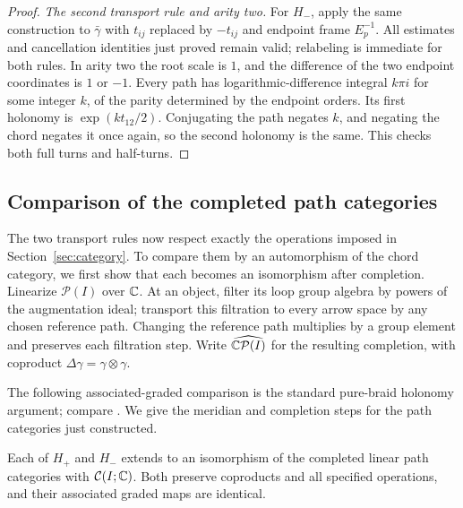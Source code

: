 \begin{proof}
\emph{The second transport rule and arity two.}
For $H_-$, apply the same construction to $\bar\gamma$ with
$t_{ij}$ replaced by $-t_{ij}$ and endpoint frame $E_p^{-1}$.
All estimates and cancellation identities just proved remain valid;
relabeling is immediate for both rules.  In arity two the root scale
is $1$, and the difference of the two endpoint coordinates is $1$ or
$-1$.  Every path has logarithmic-difference integral $k\pi i$ for
some integer $k$, of the parity determined by the endpoint orders.
Its first holonomy is $\exp(kt_{12}/2)$.  Conjugating the path negates
$k$, and negating the chord negates it once again, so the second
holonomy is the same.  This checks both full turns and half-turns.
\end{proof}

\subsection{Comparison of the completed path categories}
The two transport rules now respect exactly the operations imposed in
Section~\ref{sec:category}.  To compare them by an automorphism of the
chord category, we first show that each becomes an isomorphism after
completion.
Linearize $\mathcal P(I)$ over $\mathbb C$.
At an object, filter its loop group algebra by powers
of the augmentation ideal; transport this filtration to every arrow
space by any chosen reference path.  Changing the reference path
multiplies by a group element and preserves each filtration step.
Write $\widehat{\mathbb C\mathcal P(I)}$ for the resulting completion, with
coproduct $\Delta\gamma=\gamma\otimes\gamma$.

The following associated-graded comparison is the standard pure-braid
holonomy argument; compare \cite[Proposition~3.6]{BarNatan}.
We give the meridian and completion steps for the path categories just
constructed.

\begin{lemma}\label{lem:holonomy-isomorphism}
Each of $H_+$ and $H_-$ extends to an isomorphism of the completed
linear path categories with $\mathcal C(I;\mathbb C)$.  Both preserve
coproducts and all specified operations, and their associated graded
maps are identical.
\end{lemma}

